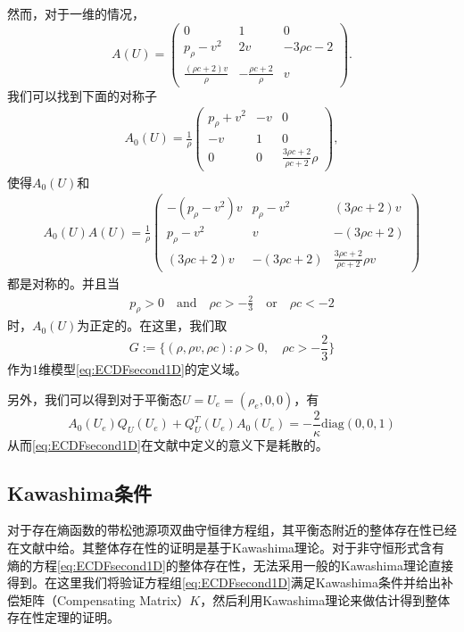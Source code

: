 然而，对于一维的情况，
\begin{equation*}
	A(U) = \left( \begin{array}{ccc}
		0 & 1 & 0 \\
		p_\rho - v^2 & 2v & -3 \rho c - 2 \\
		\frac{ (\rho c + 2) v}{\rho} & -  \frac{\rho c + 2}{\rho} & v 
	\end{array}\right).
\end{equation*}
我们可以找到下面的对称子
\begin{eqnarray}\label{31}
A_0(U) = \frac{1}{\rho} \left( \begin{array}{ccc}
	 p_\rho  +v^2 & -v & 0 \\ [2mm]
	-v & 1 & 0 \\[2mm]
	0 & 0 & \frac{3\rho c+2}{\rho c+2}\rho  \end{array} \right),
\end{eqnarray}
使得$A_0(U)$和
\begin{eqnarray*}
A_0(U) A(U) = \frac{1}{\rho} \left( \begin{array}{ccc}
		-(p_{\rho}-v^2)v & {p_\rho -v^2} & {(3\rho c + 2)v} \\[2mm]
		{p_\rho-v^2} & {v} & -{(3 \rho c+2)} \\[2mm]
		{(3 \rho c+ 2)v} & -{(3 \rho c+2)} & \frac{3\rho c+2}{\rho c + 2}\rho v
		\end{array} \right)
\end{eqnarray*}
都是对称的。并且当
\begin{eqnarray*}
p_\rho > 0 \quad \mbox{and} \quad \rho c > -\frac{2}{3} \quad \mbox{or} \quad  \rho c < -2 
\end{eqnarray*}
时，$A_0(U)$为正定的。在这里，我们取
\begin{equation}\label{37}
G := \{(\rho,\rho v, \rho c): \rho>0, \quad \rho c> - \frac{2}{3}\}
\end{equation}
作为1维模型\eqref{eq:ECDFsecond1D}的定义域。

另外，我们可以得到对于平衡态$U=U_e = (\rho_e,0,0)$，有
\begin{equation}\label{32}
A_0(U_e)Q_U(U_e) + Q_U^T(U_e)A_0(U_e) =-\frac{2}{\kappa}\mbox{diag}(0, 0, 1)
\end{equation}
从而\eqref{eq:ECDFsecond1D}在文献\cite{yong1992singular,yong1999singular}中定义的意义下是耗散的。

\subsection{Kawashima条件}
对于存在熵函数的带松弛源项双曲守恒律方程组，其平衡态附近的整体存在性已经在文献\cite{yong2004entropy,hanouzet2003global}中给。其整体存在性的证明是基于Kawashima理论。对于非守恒形式含有熵的方程\eqref{eq:ECDFsecond1D}的整体存在性，无法采用一般的Kawashima理论直接得到。在这里我们将验证方程组\eqref{eq:ECDFsecond1D}满足Kawashima条件并给出补偿矩阵（Compensating Matrix）$K$\cite{kawashima1985systems}，然后利用Kawashima理论来做估计得到整体存在性定理的证明。

